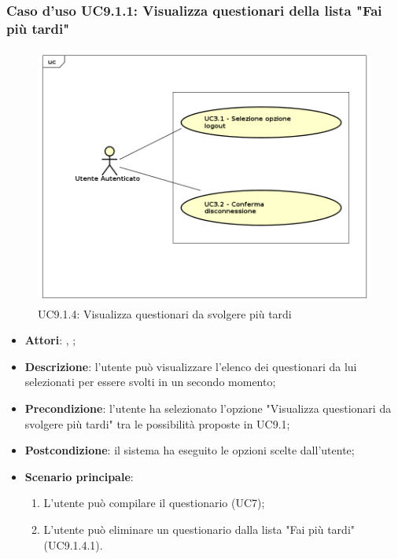 			\subsubsection{Caso d'uso UC9.1.1: Visualizza questionari della lista "Fai più tardi"}
			\label{UC9.1.4}
			\begin{figure}[h]
				\centering
				\includegraphics[scale=0.7,keepaspectratio]{UML/UC9.png}
				\caption{UC9.1.4: Visualizza questionari da svolgere più tardi}
			\end{figure}
			\FloatBarrier
			\begin{itemize}
				\item \textbf{Attori}: \uau, \uaupro;
				\item \textbf{Descrizione}: l'utente può visualizzare l'elenco dei questionari da lui selezionati per essere svolti in un secondo momento;
				\item \textbf{Precondizione}: l'utente ha selezionato l'opzione "Visualizza questionari da svolgere più tardi" tra le possibilità proposte in UC9.1;
				\item \textbf{Postcondizione}: il sistema ha eseguito le opzioni scelte dall'utente;
				\item \textbf{Scenario principale}: 
				\begin{enumerate}
					\item L'utente può compilare il questionario (UC7);
					\item L'utente può eliminare un questionario dalla lista "Fai più tardi" (UC9.1.4.1).
				\end{enumerate}
			\end{itemize}
				
